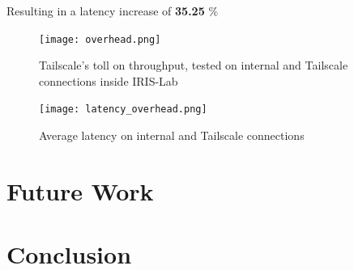\documentclass[11pt,twoside,a4paper]{report}
\begin{document}
Resulting in a latency increase of \textbf{35.25} \%


\begin{figure}[h]
\centering
  \texttt{[image: overhead.png]}
  \caption{Tailscale's toll on throughput, tested on internal and Tailscale connections inside IRIS-Lab}
  \label{fig:overhead}
\end{figure}

\begin{figure}[h]
\centering
  \texttt{[image: latency\_overhead.png]}
  \caption{Average latency on internal and Tailscale connections}
  \label{fig:latency_overhead}
\end{figure}

\chapter{Future Work}

\chapter{Conclusion}


%
%
\cleardoublepage



\cleardoublepage
\end{document}
